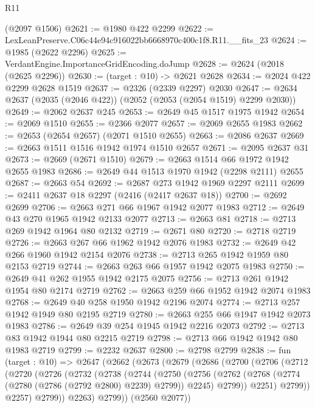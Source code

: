 \begin{lexlean}{R11}
\begin{coremodule}
    (@2097 @1506)
@2621 := @1980 @422 @2299
@2622 := LexLeanPreserve.C06c44e94c916022bb6668970c400c1f8.R11.__fits_23
@2624 := @1985 (@2622 @2296)
@2625 := VerdantEngine.ImportanceGridEncoding.doJump
@2628 := @2624 (@2018 (@2625 @2296))
@2630 := (target : @10) -> @2621 @2628
@2634 := @2024 @422 @2299 @2628 @1519
@2637 := @2326 (@2339 @2297) @2030
@2647 := @2634 @2637 (@2035 (@2046 @422)) (@2052 (@2053 (@2054 @1519) @2299 @2030))
@2649 := @2062 @2637 @245
@2653 := @2649 @45 @1517 @1975 @1942
@2654 := @2069 @1510
@2655 := @2366 @2077
@2657 := @2069 @2655 @1983
@2662 := @2653 (@2654 @2657) (@2071 @1510 @2655)
@2663 := @2086 @2637
@2669 := @2663 @1511 @1516 @1942 @1974 @1510 @2657
@2671 := @2095 @2637 @31
@2673 := @2669 (@2671 @1510)
@2679 := @2663 @1514 @66 @1972 @1942 @2655 @1983
@2686 := @2649 @44 @1513 @1970 @1942 (@2298 @2111) @2655
@2687 := @2663 @54
@2692 := @2687 @273 @1942 @1969 @2297 @2111
@2699 := @2411 @2637 @18 @2297 (@2416 (@2417 @2637 @18))
@2700 := @2692 @2699
@2706 := @2663 @271 @66 @1967 @1942 @2077 @1983
@2712 := @2649 @43 @270 @1965 @1942 @2133 @2077
@2713 := @2663 @81
@2718 := @2713 @269 @1942 @1964 @80 @2132
@2719 := @2671 @80
@2720 := @2718 @2719
@2726 := @2663 @267 @66 @1962 @1942 @2076 @1983
@2732 := @2649 @42 @266 @1960 @1942 @2154 @2076
@2738 := @2713 @265 @1942 @1959 @80 @2153 @2719
@2744 := @2663 @263 @66 @1957 @1942 @2075 @1983
@2750 := @2649 @41 @262 @1955 @1942 @2175 @2075
@2756 := @2713 @261 @1942 @1954 @80 @2174 @2719
@2762 := @2663 @259 @66 @1952 @1942 @2074 @1983
@2768 := @2649 @40 @258 @1950 @1942 @2196 @2074
@2774 := @2713 @257 @1942 @1949 @80 @2195 @2719
@2780 := @2663 @255 @66 @1947 @1942 @2073 @1983
@2786 := @2649 @39 @254 @1945 @1942 @2216 @2073
@2792 := @2713 @83 @1942 @1944 @80 @2215 @2719
@2798 := @2713 @66 @1942 @1942 @80 @1983 @2719
@2799 := @2232 @2637
@2800 := @2798 @2799
@2838 := fun (target : @10) =>
  @2647
    (@2662
      (@2673
        (@2679
          (@2686
            (@2700
              (@2706
                (@2712
                  (@2720
                    (@2726
                      (@2732
                        (@2738
                          (@2744
                            (@2750
                              (@2756
                                (@2762
                                  (@2768 (@2774 (@2780 (@2786 (@2792 @2800) @2239) @2799)) @2245)
                                  @2799))
                              @2251)
                            @2799))
                        @2257)
                      @2799))
                  @2263)
                @2799))
            (@2560 @2077))

\end{coremodule}
\end{lexlean}
